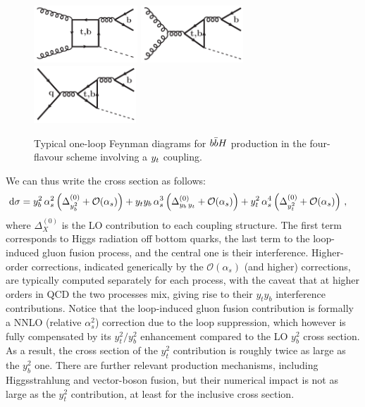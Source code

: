 \documentclass[11pt,a4paper]{article}
\begin{document}
\begin{figure}[b]
\begin{center}
    \includegraphics[height=2.15cm]{./diags/gg-bbH1loop2tb_4F.pdf}\hspace{1.2cm}
    \includegraphics[height=2.15cm]{./diags/gg-bbH1loop5tb.pdf}\hspace{1.2cm}
    \includegraphics[height=2.15cm]{./diags/qq-bbH1loop2tb.pdf}
  \caption{Typical one-loop Feynman diagrams for $b\bar{b}H$ production in the four-flavour scheme involving a $y_t$ coupling.}
  \label{fig:bbhyt}
\end{center}
\end{figure}

We can thus write the \bbH{} cross section as follows:
\begin{equation}
\begin{split}
    {\rm d} \sigma & = y_b^2{}\,\alpha_s^2\left( \Delta_{y_b^2}^{(0)} + \mathcal O(\alpha_s) \right) +y_t y_b\, \alpha_s^3\left( \Delta_{y_b\, y_t}^{(0)} + \mathcal O(\alpha_s)  \right) + y_t^2{} \,\alpha_s^4\left( \Delta_{y_t^2}^{(0)} + \mathcal O(\alpha_s)  \right)\, ,
\end{split}
\label{eq:hbbxsec2}
\end{equation}
where $\Delta_{X}^{(0)}$ is the LO contribution to each coupling structure. The first term corresponds to Higgs radiation off bottom quarks, the last term
to the loop-induced gluon fusion process, and the central one is their interference. Higher-order corrections, indicated generically
by the $\mathcal O(\alpha_s)$ (and higher) corrections, 
are typically computed separately for each process, with the caveat that at higher orders in QCD the two processes mix, giving rise 
to their $y_t y_b$ interference contributions. Notice that the loop-induced gluon fusion contribution is formally a NNLO (relative $\alpha_s^2$) correction
due to the loop suppression, which however is fully compensated by its $y_t^2/y_b^2$ enhancement compared to the LO $y_b^2$ cross section.
As a result, the cross section of the $y_t^2$ contribution is roughly twice as large as the $y_b^2$ one.
There are further relevant \bbH{} production mechanisms, including Higgsstrahlung and vector-boson fusion, 
but their numerical impact is not as large as the $y_t^2$ contribution, at least for the inclusive cross section.
\end{document}
